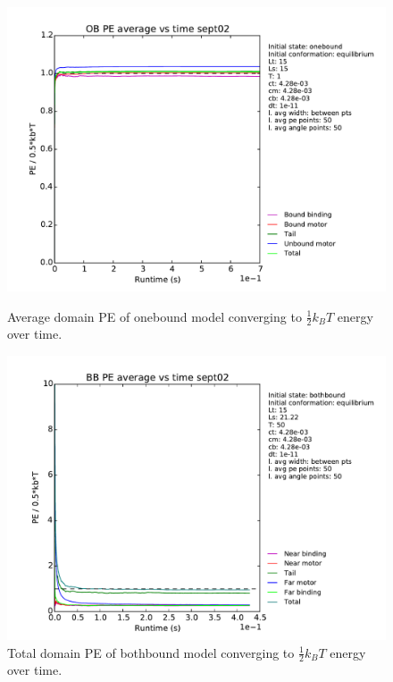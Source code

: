 \documentclass[10pt]{article} %
\begin{document}
\begin{figure}[h!]
  \centering
  \begin{minipage}[b]{0.45\textwidth}
    \includegraphics[width=\textwidth]{../../figures/OB_Average_PE.pdf}
    \caption{Average domain PE of onebound model converging to $\frac12 k_BT$ energy over time.}
  \end{minipage}
  \hspace{.2cm}
  \begin{minipage}[b]{0.45\textwidth}
    \includegraphics[width=\textwidth]{../../figures/BB_Average_PE.pdf}
    \caption{Total domain PE of bothbound model converging to $\frac12 k_BT$ energy over time.}
  \end{minipage}
  \label{fig:equipartition_agreement}
\end{figure}
\end{document}
